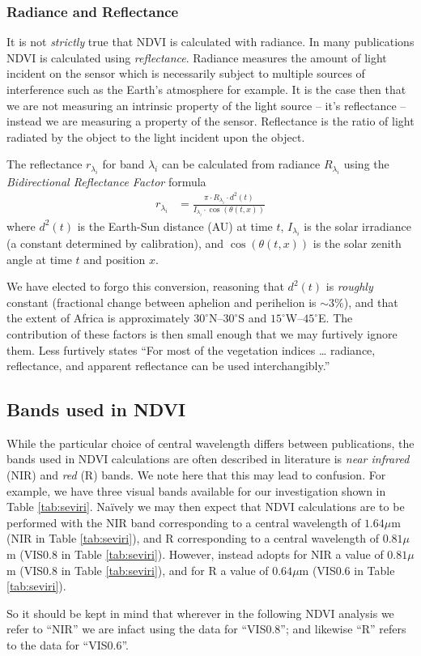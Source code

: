\subsubsection{Radiance and Reflectance}

It is not \emph{strictly} true that NDVI is calculated with
radiance. In many publications NDVI is calculated using
\emph{reflectance}. Radiance measures the amount of light incident on
the sensor which is necessarily subject to multiple sources of
interference such as the Earth's atmosphere for example. It is the
case then that we are not measuring an intrinsic property of the light
source -- it's reflectance -- instead we are measuring a property of the
sensor. Reflectance is the ratio of light radiated by the object to
the light incident upon the object.

The reflectance $r_{\lambda_i}$ for band $\lambda_i$ can be calculated from
radiance $R_{\lambda_i}$ using the \emph{Bidirectional Reflectance Factor}
formula \citep{msgbdrf2012}
\begin{align}
  r_{\lambda_i} &= \frac{\pi \cdot R_{\lambda_i} \cdot d^2\left(t\right)} {I_{\lambda_i} \cdot
    \cos\left(\theta\left(t, x\right)\right)}
\end{align}
where $d^2\left(t\right)$ is the Earth-Sun distance (AU) at time $t$,
$I_{\lambda_i}$ is the solar irradiance (a constant determined by
calibration), and $\cos\left(\theta\left(t, x\right)\right)$ is the solar
zenith angle at time $t$ and position $x$.

We have elected to forgo this conversion, reasoning that
$d^2\left(t\right)$ is \emph{roughly} constant (fractional change
between aphelion and perihelion is ${\sim}3\%$), and that the extent of
Africa is approximately $30^{\circ}$N--$30^{\circ}$S and
$15^{\circ}$W--$45^{\circ}$E. The contribution of these factors is then small
enough that we may furtively ignore them. Less furtively
\cite{ray1994} states ``For most of the vegetation indices \dots
radiance, reflectance, and apparent reflectance can be used
interchangibly.''

\subsection{Bands used in NDVI}

While the particular choice of central wavelength differs between
publications, the bands used in NDVI calculations are often described
in literature is \emph{near infrared} (NIR) and \emph{red} (R)
bands. We note here that this may lead to confusion. For example, we
have three visual bands available for our investigation shown in Table
\ref{tab:seviri}. Na{\"i}vely we may then expect that NDVI
calculations are to be performed with the NIR band corresponding to a
central wavelength of $1.64\mu$m (NIR in Table \ref{tab:seviri}), and R
corresponding to a central wavelength of $0.81\mu$m (VIS0.8 in Table
\ref{tab:seviri}). However, \cite{msgndvi2015} instead adopts for NIR
a value of $0.81\mu$m (VIS0.8 in Table \ref{tab:seviri}), and for R a
value of $0.64\mu$m (VIS0.6 in Table \ref{tab:seviri}).

So it should be kept in mind that wherever in the following NDVI
analysis we refer to ``NIR'' we are infact using the data for
``VIS0.8''; and likewise ``R'' refers to the data for ``VIS0.6''.


